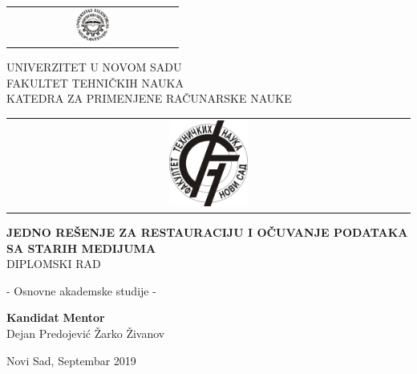 \begin{titlepage}
\begin{tabular}{@{}c@{}}
\includegraphics[width=0.2\textwidth]{img/uns.jpg}
\end{tabular}
\begin{minipage}[c]{0.6\textwidth}
\centering
UNIVERZITET U NOVOM SADU\\
FAKULTET TEHNIČKIH NAUKA\\
KATEDRA ZA PRIMENJENE RAČUNARSKE NAUKE
\end{minipage}
\begin{tabular}{@{}c@{}}
\includegraphics[width=0.2\textwidth]{img/ftn.jpg}
\end{tabular}

\vspace*{\fill}
\centering
{\Large \bf JEDNO REŠENJE ZA RESTAURACIJU I OČUVANJE PODATAKA SA STARIH MEDIJUMA}\\
DIPLOMSKI RAD

- Osnovne akademske studije -
\\
\vspace*{\fill}

\textbf{Kandidat}
\hfill
\textbf{Mentor} \\
Dejan Predojević
\hfill
Žarko Živanov

Novi Sad, Septembar 2019

\end{titlepage}